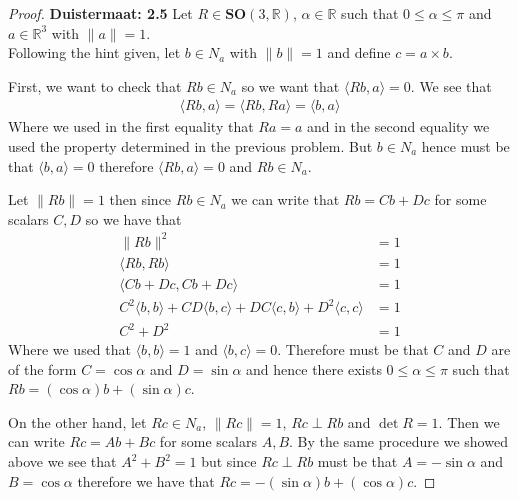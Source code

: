 \documentclass[11pt]{article}
\newcommand{\R}{\mathbb{R}}
\theoremstyle{definition}
\begin{document}
\begin{proof}{\textbf{Duistermaat: 2.5}}
    Let $R \in \bm{SO}(3, \R)$, $\alpha \in \R$ such that
    $0 \leq \alpha \leq \pi$ and $a \in \R^3$ with $\|a\| = 1$.\\
    Following the hint given, let $b \in N_a$ with $\|b\| = 1$ and define
    $c = a \times b$.

    First, we want to check that $Rb \in N_a$ so we want that
    $\langle Rb, a \rangle = 0$. We see that
    \begin{align*}
        \langle Rb, a \rangle = \langle Rb, Ra \rangle = \langle b, a\rangle
    \end{align*}
    Where we used in the first equality that $Ra = a$ and in the second
    equality we used the property determined in the previous problem.
    But $b \in N_a$ hence must be that $\langle b, a \rangle = 0$ therefore 
    $\langle Rb, a \rangle = 0$ and $Rb \in N_a$.

    Let $\|Rb\| = 1$ then since $Rb \in N_a$ we can write that
    $Rb = C b + D c$ for some scalars $C,D$ so we have that
    \begin{align*}
        \|Rb\|^2 &= 1\\
        \langle Rb, Rb\rangle &= 1\\
        \langle Cb + Dc, Cb + Dc\rangle &= 1\\
        C^2\langle b, b\rangle + CD\langle b, c\rangle
        + DC\langle c, b\rangle + D^2\langle c, c\rangle &= 1\\
        C^2 + D^2 &= 1
    \end{align*}
    Where we used that $\langle b, b\rangle = 1$ and $\langle b, c\rangle = 0$.
    Therefore must be that $C$ and $D$ are of the form $C = \cos\alpha$ and
    $D = \sin\alpha$ and hence there exists $0\leq \alpha\leq \pi$ such that
    $Rb = (\cos\alpha) b + (\sin\alpha) c$.

    On the other hand, let $Rc \in N_a$, $\|Rc\| = 1$, $Rc \perp Rb$ and
    $\det R = 1$. Then we can write $Rc = Ab + Bc$ for some scalars $A,B$.
    By the same procedure we showed above we see that $A^2 + B^2 = 1$ but
    since $Rc \perp Rb$ must be that $A = -\sin\alpha$ and $B = \cos\alpha$
    therefore we have that $Rc = -(\sin\alpha) b + (\cos\alpha) c$.


\end{proof}
\end{document}
